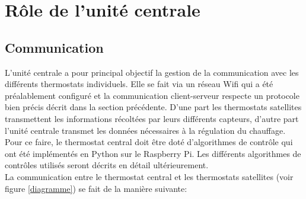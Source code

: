 \documentclass[12pt]{report}
\begin{document}
\section{Rôle de l'unité centrale}
\subsection{Communication}
L'unité centrale a pour principal objectif la gestion de la communication avec les différents thermostats individuels. Elle se fait via un réseau Wifi qui a été préalablement configuré et la communication client-serveur respecte un protocole bien précis décrit dans la section précédente.
D'une part les thermostats satellites transmettent les informations récoltées par leurs différents capteurs, d'autre part l'unité centrale transmet les données nécessaires à la régulation du chauffage. Pour ce faire, le thermostat central doit être doté d'algorithmes de contrôle qui ont été implémentés en Python sur le Raspberry Pi. Les différents algorithmes de contrôles utilisés seront décrits en détail ultérieurement.\\

\noindent
La communication entre le thermostat central et les thermostats satellites (voir figure \ref{diagramme}) se fait de la manière suivante:\\
\end{document}
